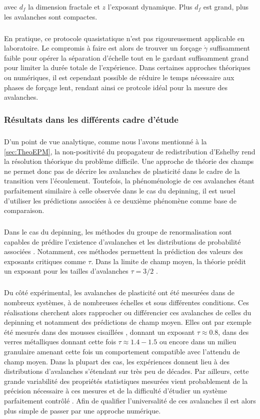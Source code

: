 \noindent avec $d_f$ la dimension fractale et $z$ l'exposant dynamique. Plus $d_f$ est grand, plus les avalanches sont compactes.

\subparagraph{}En pratique, ce protocole quasistatique n'est pas rigoureusement applicable en laboratoire. Le compromis à faire est alors de trouver un forçage $\dot{\gamma}$ suffisamment faible pour opérer la séparation d'échelle tout en le gardant suffisamment grand pour limiter la durée totale de l'expérience. Dans certaines approches théoriques ou numériques, il est cependant possible de réduire le temps nécessaire aux phases de forçage lent, rendant ainsi ce protcole idéal pour la mesure des avalanches.

\subsubsection{Résultats dans les différents cadre d'étude}

\subparagraph{}D'un point de vue analytique, comme nous l'avons mentionné à la \autoref{sec:TheoEPM}, la non-positivité du propagateur de redistribution d'Eshelby rend la résolution théorique du problème difficile. Une approche de théorie des champs ne permet donc pas de décrire les avalanches de plasticité dans le cadre de la transition vers l'écoulement. Toutefois, la phénoménologie de ces avalanches étant parfaitement similaire à celle observée dans le cas du depinning, il est usuel d'utiliser les prédictions associées à ce deuxième phénomène comme base de comparaison.

\subparagraph{}Dans le cas du depinning, les méthodes du groupe de renormalisation sont capables de prédire l'existence d'avalanches et les distributions de probabilité associées \cite{wiese_theory_2022}. Notamment, ces méthodes permettent la prédiction des valeurs des exposants critiques comme $\tau$. Dans la limite de champ moyen, la théorie prédit un exposant pour les tailles d'avalanches $\tau = 3/2$ \cite{le_doussal_size_2009}.

\subparagraph{}Du côté expérimental, les avalanches de plasticité ont été mesurées dans de nombreux systèmes, à de nombreuses échelles et sous différentes conditions. Ces réalisations cherchent alors rapprocher ou différencier ces avalanches de celles du depinning et notamment des prédictions de champ moyen. Elles ont par exemple été mesurés dans des mousses cisaillées \cite{lauridsen_shear-induced_2002}, donnant un exposant $\tau\approx 0.8$, dans des verres métalliques \cite{sun_plasticity_2010} donnant cette fois $\tau\approx 1.4-1.5$ ou encore dans un milieu granulaire \cite{denisov_universality_2016} amenant cette fois un comportement compatible avec l'attendu de champ moyen. Dans la plupart des cas, les expériences donnent lieu à des distributions d'avalanches s'étendant sur très peu de décades. Par ailleurs, cette grande variabilité des propriétés statistiques mesurées vient probablement de la précision nécessaire à ces mesures et de la difficulté d'étudier un système parfaitement contrôlé \cite{bonn_yield_2017}. Afin de qualifier l'universalité de ces avalanches il est alors plus simple de passer par une approche numérique.

